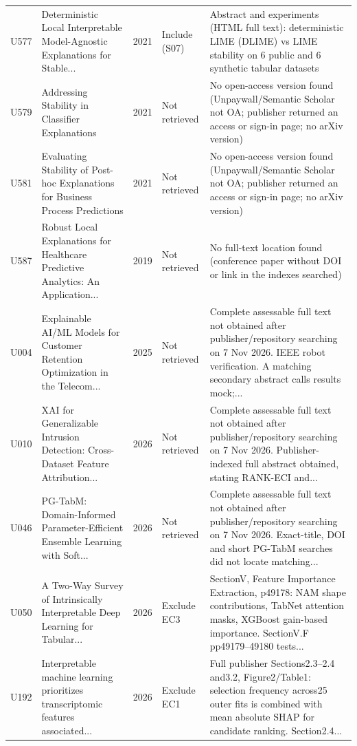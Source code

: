 \begin{longtable}{@{}P{1.0cm}P{6.3cm}P{0.7cm}P{1.6cm}P{6.1cm}@{}}
U577 & Deterministic Local Interpretable Model-Agnostic Explanations for Stable... & 2021 & Include (S07) & Abstract and experiments (HTML full text): deterministic LIME (DLIME) vs LIME stability on 6 public and 6 synthetic tabular datasets \\
U579 & Addressing Stability in Classifier Explanations & 2021 & Not retrieved & No open-access version found (Unpaywall/\allowbreak{}Semantic Scholar not OA; publisher returned an access or sign-in page; no arXiv version) \\
U581 & Evaluating Stability of Post-hoc Explanations for Business Process Predictions & 2021 & Not retrieved & No open-access version found (Unpaywall/\allowbreak{}Semantic Scholar not OA; publisher returned an access or sign-in page; no arXiv version) \\
U587 & Robust Local Explanations for Healthcare Predictive Analytics: An Application... & 2019 & Not retrieved & No full-text location found (conference paper without DOI or link in the indexes searched) \\
U004 & Explainable AI/\allowbreak{}ML Models for Customer Retention Optimization in the Telecom... & 2025 & Not retrieved & Complete assessable full text not obtained after publisher/\allowbreak{}repository searching on 7 Nov 2026. IEEE robot verification. A matching secondary abstract calls results mock;... \\
U010 & XAI for Generalizable Intrusion Detection: Cross-Dataset Feature Attribution... & 2026 & Not retrieved & Complete assessable full text not obtained after publisher/\allowbreak{}repository searching on 7 Nov 2026. Publisher-indexed full abstract obtained, stating RANK-ECI and... \\
U046 & PG-TabM: Domain-Informed Parameter-Efficient Ensemble Learning with Soft... & 2026 & Not retrieved & Complete assessable full text not obtained after publisher/\allowbreak{}repository searching on 7 Nov 2026. Exact-title, DOI and short PG-TabM searches did not locate matching... \\
U050 & A Two-Way Survey of Intrinsically Interpretable Deep Learning for Tabular... & 2026 & Exclude EC3 & SectionV, Feature Importance Extraction, p49178: NAM shape contributions, TabNet attention masks, XGBoost gain-based importance. SectionV.F pp49179--49180 tests... \\
U192 & Interpretable machine learning prioritizes transcriptomic features associated... & 2026 & Exclude EC1 & Full publisher Sections2.3--2.4 and3.2, Figure2/\allowbreak{}Table1: selection frequency across25 outer fits is combined with mean absolute SHAP for candidate ranking. Section2.4... \\

\end{longtable}
